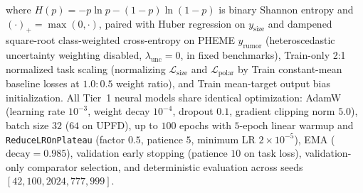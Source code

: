 \documentclass[conference]{IEEEtran}
\begin{document}
where $H(p) = -p\ln p - (1-p)\ln(1-p)$ is binary Shannon entropy and $(\cdot)_+ = \max(0, \cdot)$, paired with Huber regression on $y_{\text{size}}$ and dampened square-root class-weighted cross-entropy on PHEME $y_{\text{rumor}}$ (heteroscedastic uncertainty weighting disabled, $\lambda_{\text{unc}} = 0$, in fixed benchmarks), Train-only 2:1 normalized task scaling (normalizing $\mathcal{L}_{\text{size}}$ and $\mathcal{L}_{\text{polar}}$ by Train constant-mean baseline losses at $1.0 : 0.5$ weight ratio), and Train mean-target output bias initialization. All Tier~1 neural models share identical optimization: AdamW (learning rate $10^{-3}$, weight decay $10^{-4}$, dropout $0.1$, gradient clipping norm $5.0$), batch size $32$ ($64$ on UPFD), up to $100$ epochs with $5$-epoch linear warmup and \texttt{ReduceLROnPlateau} (factor $0.5$, patience $5$, minimum LR $2\times 10^{-5}$), EMA ($\text{decay}=0.985$), validation early stopping (patience $10$ on task loss), validation-only comparator selection, and deterministic evaluation across seeds $[42, 100, 2024, 777, 999]$.
\end{document}
